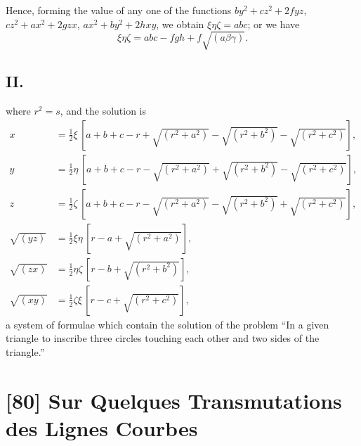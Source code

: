 \documentclass[12pt,a4paper]{article}
\begin{document}
Hence, forming the value of any one of the functions $by^2 + cz^2 + 2fyz$, $cz^2 + ax^2 + 2gzx$, $ax^2 + by^2 + 2hxy$, we obtain $\xi\eta\zeta = abc$; or we have
\[
\xi\eta\zeta = abc - fgh + f\sqrt{(a\beta\gamma)}.
\]

\subsection*{II.}

where $r^2 = s$, and the solution is
\begin{align*}
x &= \tfrac{1}{2}\xi\,[a + b + c - r + \sqrt{(r^2 + a^2)} - \sqrt{(r^2 + b^2)} - \sqrt{(r^2 + c^2)}], \\
y &= \tfrac{1}{2}\eta\,[a + b + c - r - \sqrt{(r^2 + a^2)} + \sqrt{(r^2 + b^2)} - \sqrt{(r^2 + c^2)}], \\
z &= \tfrac{1}{2}\zeta\,[a + b + c - r - \sqrt{(r^2 + a^2)} - \sqrt{(r^2 + b^2)} + \sqrt{(r^2 + c^2)}], \\
\sqrt{(yz)} &= \tfrac{1}{2}\xi\eta\,[r - a + \sqrt{(r^2 + a^2)}], \\
\sqrt{(zx)} &= \tfrac{1}{2}\eta\zeta\,[r - b + \sqrt{(r^2 + b^2)}], \\
\sqrt{(xy)} &= \tfrac{1}{2}\zeta\xi\,[r - c + \sqrt{(r^2 + c^2)}],
\end{align*}
a system of formulae which contain the solution of the problem ``In a given triangle to inscribe three circles touching each other and two sides of the triangle.''

\newpage
\section*{[80] Sur Quelques Transmutations des Lignes Courbes}

\bigskip
\end{document}
